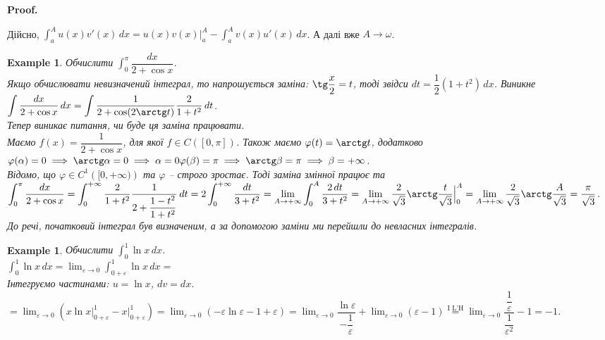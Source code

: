 \documentclass[a4paper, 10pt]{article}
\makeatletter
\def\huge{\displaystyle}
\theoremstyle{theoremdd}
\theoremstyle{theoremdd}
\theoremstyle{theoremdd}
\theoremstyle{theoremdd}
\theoremstyle{theoremdd}
\newtheorem{example}[theorem]{Example}
\theoremstyle{theoremdd}
\theoremstyle{theoremdd}
\theoremstyle{theoremdd}
\theoremstyle{theoremdd}
\renewenvironment{proof}[1][Proof.\\]{\par
\pushQED{\hfill \qed}%
\normalfont \topsep6\p@\@plus6\p@\relax
\trivlist
\item\relax
{\bfseries
#1\@addpunct{.}}\hspace\labelsep\ignorespaces
}{%
\popQED\endtrivlist\@endpefalse
}
\makeatother
\begin{document}
\begin{proof}
Дійсно, $\displaystyle\int_a^A u(x)v'(x)\,dx = u(x)v(x) \Big|_a^{A} - \int_a^A v(x)u'(x)\,dx$. А далі вже $A \to \omega$.
\end{proof}

\begin{example}
Обчислити $\huge\int_0^{\pi} \dfrac{dx}{2+\cos x}$.\\
Якщо обчислювати невизначений інтеграл, то напрошується заміна:  $\tg \dfrac{x}{2} = t$, тоді звідси $dt = \dfrac{1}{2} (1+t^2)\,dx$. Виникне $\huge\int \dfrac{dx}{2+\cos x} \,dx = \int \dfrac{1}{2+\cos (2 \arctg t)} \dfrac{2}{1+t^2}\,dt$.\\
Тепер виникає питання, чи буде ця заміна працювати.\\
Маємо $f(x) = \dfrac{1}{2+\cos x}$, для якої $f \in C([0,\pi])$. Також маємо $\varphi(t) = \arctg t$, додатково \\
$\varphi(\alpha) = 0 \implies \arctg \alpha = 0 \implies \alpha = 0 \\
\varphi(\beta) = \pi \implies \arctg \beta = \pi \implies \beta = +\infty$.\\ 
Відомо, що $\varphi \in C^1\left([0,+\infty)\right)$ та $\varphi$ -- строго зростає. Тоді заміна змінної працює та\\
$\huge\int_0^\pi \dfrac{dx}{2+\cos x} = \int_0^{+\infty} \dfrac{2}{1+t^2} \dfrac{1}{2 + \dfrac{1-t^2}{1+t^2}}\,dt = 2 \int_0^{+\infty} \dfrac{dt}{3+t^2} = \lim_{A \to +\infty} \int_0^A \dfrac{2\,dt}{3+t^2} = \lim_{A \to +\infty} \dfrac{2}{\sqrt{3}} \arctg \dfrac{t}{\sqrt{3}} \Big|_0^A = \lim_{A \to +\infty} \dfrac{2}{\sqrt{3}} \arctg \dfrac{A}{\sqrt{3}} = \dfrac{\pi}{\sqrt{3}}$.\\
До речі, початковий інтеграл був визначеним, а за допомогою заміни ми перейшли до невласних інтегралів.
\end{example}

\begin{example} Обчислити $\huge\int_0^1 \ln x \,dx$.\\
$\huge\int_0^1 \ln x \,dx = \huge \lim_{\varepsilon \to 0} \int_{0+\varepsilon}^1 \ln x \,dx \boxed{=}$\\
Інтегруємо частинами: $u = \ln x$, $dv = dx$.\\
$\boxed{=} \huge\lim_{\varepsilon \to 0} \left(x \ln x \Big|_{0+\varepsilon}^1 - x \Big|_{0+\varepsilon}^1 \right) = \lim_{\varepsilon \to 0} \left( -\varepsilon \ln \varepsilon - 1 + \varepsilon \right) = \lim_{\varepsilon \to 0} \dfrac{\ln \varepsilon}{-\dfrac{1}{\varepsilon}} + \lim_{\varepsilon \to 0} (\varepsilon - 1) \overset{\text{I L'H}}{=} \lim_{\varepsilon \to 0} \dfrac{\dfrac{1}{\varepsilon}}{\dfrac{1}{\varepsilon^2}} - 1 = -1$.
\end{example}
\end{document}
